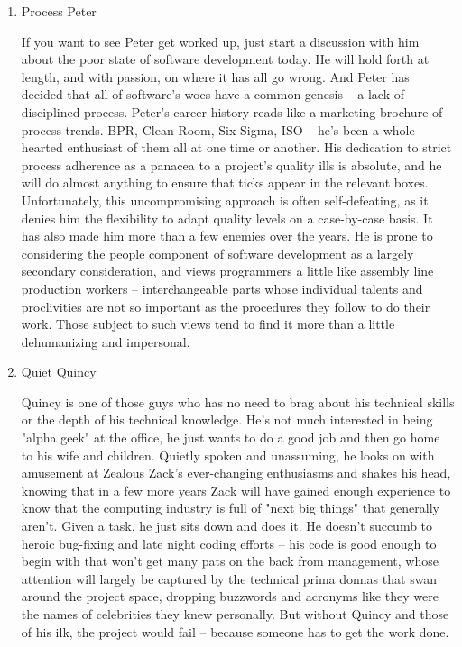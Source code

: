 \documentclass{article}
\begin{document}
\begin{enumerate}
\item Process Peter
\label{sec:orgheadline19}

If you want to see Peter get worked up, just start a discussion with him
about the poor state of software development today. He will hold forth
at length, and with passion, on where it has all go wrong. And Peter has
decided that all of software's woes have a common genesis -- a lack of
disciplined process. Peter's career history reads like a marketing
brochure of process trends. BPR, Clean Room, Six Sigma, ISO -- he's been
a whole-hearted enthusiast of them all at one time or another. His
dedication to strict process adherence as a panacea to a project's
quality ills is absolute, and he will do almost anything to ensure that
ticks appear in the relevant boxes. Unfortunately, this uncompromising
approach is often self-defeating, as it denies him the flexibility to
adapt quality levels on a case-by-case basis. It has also made him more
than a few enemies over the years. He is prone to considering the people
component of software development as a largely secondary consideration,
and views programmers a little like assembly line production workers --
interchangeable parts whose individual talents and proclivities are not
so important as the procedures they follow to do their work. Those
subject to such views tend to find it more than a little dehumanizing
and impersonal.

\item Quiet Quincy
\label{sec:orgheadline20}

Quincy is one of those guys who has no need to brag about his technical
skills or the depth of his technical knowledge. He's not much interested
in being "alpha geek" at the office, he just wants to do a good job and
then go home to his wife and children. Quietly spoken and unassuming, he
looks on with amusement at Zealous Zack's ever-changing enthusiasms and
shakes his head, knowing that in a few more years Zack will have gained
enough experience to know that the computing industry is full of "next
big things" that generally aren't. Given a task, he just sits down and
does it. He doesn't succumb to heroic bug-fixing and late night coding
efforts -- his code is good enough to begin with that won't get many
pats on the back from management, whose attention will largely be
captured by the technical prima donnas that swan around the project
space, dropping buzzwords and acronyms like they were the names of
celebrities they knew personally. But without Quincy and those of his
ilk, the project would fail -- because someone has to get the work done.


\end{enumerate}
\end{document}
